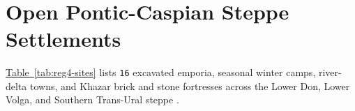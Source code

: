\documentclass[10pt,onecolumn]{intellte}
\providecommand{\crdxref}[2]{\hyperref[#2]{#1~\ref*{#2}}}
\begin{document}
\begin{longtable}[l]
\caption{Middle Volga, Kama-Vyatka, and Cis-Ural Settlements and Population Estimates (250AD - 1900AD).}\label{tab:reg3-sites}\\
\end{longtable}\endgroup
\vspace{4pt}\par

\section{Open Pontic-Caspian Steppe
Settlements}\label{open-pontic-caspian-steppe-settlements}

\crdxref{Table}{tab:reg4-sites} lists \texttt{16} excavated emporia,
seasonal winter camps, river-delta towns, and Khazar brick and stone
fortresses across the Lower Don, Lower Volga, and Southern Trans-Ural
steppe
.
\end{document}
